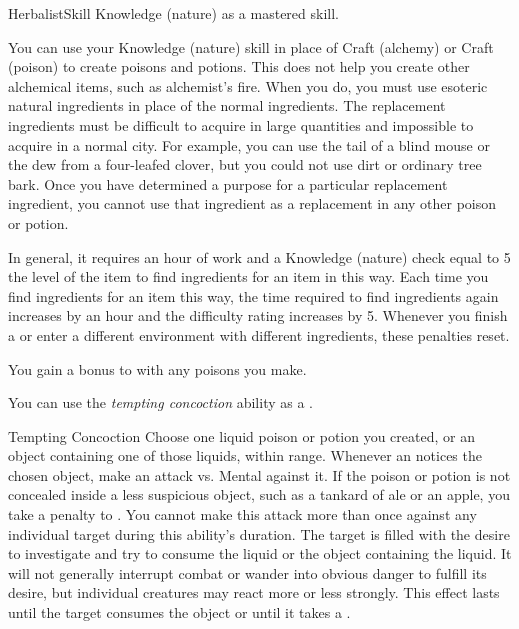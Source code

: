     \begin{feat}{Herbalist}{Skill}
        \featpre Knowledge (nature) as a mastered skill.

         You can use your Knowledge (nature) skill in place of Craft (alchemy) or Craft (poison) to create poisons and potions.
        This does not help you create other alchemical items, such as alchemist's fire.
        When you do, you must use esoteric natural ingredients in place of the normal ingredients.
        The replacement ingredients must be difficult to acquire in large quantities and impossible to acquire in a normal city.
        For example, you can use the tail of a blind mouse or the dew from a four-leafed clover, but you could not use dirt or ordinary tree bark.
        Once you have determined a purpose for a particular replacement ingredient, you cannot use that ingredient as a replacement in any other poison or potion.

        In general, it requires an hour of work and a Knowledge (nature) check equal to 5 \add the level of the item to find ingredients for an item in this way.
        Each time you find ingredients for an item this way, the time required to find ingredients again increases by an hour and the difficulty rating increases by 5.
        Whenever you finish a  or enter a different environment with different ingredients, these penalties reset.

         You gain a  bonus to  with any poisons you make.

         You can use the \textit{tempting concoction} ability as a .
        \begin{attuneability}{Tempting Concoction}
            \rankline
            Choose one liquid poison or potion you created, or an object containing one of those liquids, within \rngshort range.
            Whenever an  notices the chosen object, make an attack vs. Mental against it.
            If the poison or potion is not concealed inside a less suspicious object, such as a tankard of ale or an apple, you take a  penalty to .
            You cannot make this attack more than once against any individual target during this ability's duration.
            \hit The target is filled with the desire to investigate and try to consume the liquid or the object containing the liquid.
            It will not generally interrupt combat or wander into obvious danger to fulfill its desire, but individual creatures may react more or less strongly.
            This effect lasts until the target consumes the object or until it takes a .


\end{attuneability}
\end{feat}

